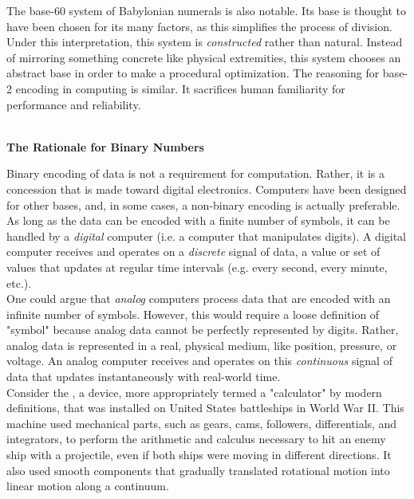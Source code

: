 The base-60 system of Babylonian numerals is also notable. Its base is thought to have been chosen for its many factors, as this simplifies the process of division. Under this interpretation, this system is \textit{constructed} rather than natural. Instead of mirroring something concrete like physical extremities, this system chooses an abstract base in order to make a procedural optimization. The reasoning for base-2 encoding in computing is similar. It sacrifices human familiarity for performance and reliability. \\\\

\begin{tcolorbox}[breakable, enhanced, colback=textbook-blue, sharp corners]
	\vspace{2mm}
	\begin{center}
		\textbf{The Rationale for Binary Numbers}
	\end{center}
	\vspace{1mm}
	
	Binary encoding of data is not a requirement for computation. Rather, it is a concession that is made toward digital electronics. Computers have been designed for other bases, and, in some cases, a non-binary encoding is actually preferable. As long as the data can be encoded with a finite number of symbols, it can be handled by a \textit{digital} computer (i.e. a computer that manipulates digits). A digital computer receives and operates on a \textit{discrete} signal of data, a value or set of values that updates at regular time intervals (e.g. every second, every minute, etc.). \\
	
	One could argue that \textit{analog} computers process data that are encoded with an infinite number of symbols. However, this would require a loose definition of "symbol" because analog data cannot be perfectly represented by digits. Rather, analog data is represented in a real, physical medium, like position, pressure, or voltage. An analog computer receives and operates on this \textit{continuous} signal of data that updates instantaneously with real-world time.  \\
	
	Consider the  , a device, more appropriately termed a "calculator" by modern definitions, that was installed on United States battleships in World War II. This machine used mechanical parts, such as gears, cams, followers, differentials, and integrators, to perform the arithmetic and calculus necessary to hit an enemy ship with a projectile, even if both ships were moving in different directions. It also used smooth components that gradually translated rotational motion into linear motion along a continuum. \\
	

\end{tcolorbox}
